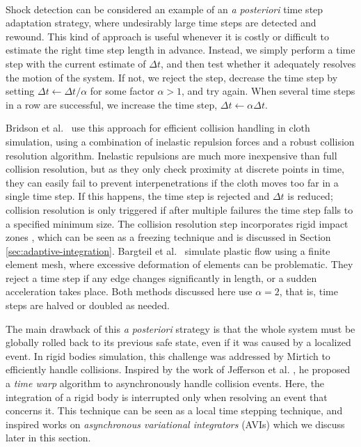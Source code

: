 \paragraph*{}
Shock detection can be considered an example of an \textit{a posteriori} time step adaptation strategy, where undesirably large time steps are detected and rewound.
This kind of approach is useful whenever it is costly or difficult to estimate the right time step length in advance.
Instead, we simply perform a time step with the current estimate of $\Delta t$, and then test whether it adequately resolves the motion of the system.
If not, we reject the step, decrease the time step by setting $\Delta t\gets\Delta t/\alpha$ for some factor $\alpha>1$, and try again.
When several time steps in a row are successful, we increase the time step, $\Delta t\gets\alpha\Delta t$.

Bridson et al.~\cite{Bridson2002} use this approach for efficient collision handling in cloth simulation, using a combination of inelastic repulsion forces and a robust collision resolution algorithm.
Inelastic repulsions are much more inexpensive than full collision resolution, but as they only check proximity at discrete points in time, they can easily fail to prevent interpenetrations if the cloth moves too far in a single time step.
If this happens, the time step is rejected and $\Delta t$ is reduced; collision resolution is only triggered if after multiple failures the time step falls to a specified minimum size.
The collision resolution step incorporates rigid impact zones \cite{Provot1997}, which can be seen as a freezing technique and is discussed in Section \ref{sec:adaptive-integration}.
Bargteil et al.~\cite{Bargteil2007} simulate plastic flow using a finite element mesh, where excessive deformation of elements can be problematic.
They reject a time step if any edge changes significantly in length, or a sudden acceleration takes place.
Both methods discussed here use $\alpha=2$, that is, time steps are halved or doubled as needed.

The main drawback of this \textit{a posteriori} strategy is that the whole system must be globally rolled back to its previous safe state, even if it was caused by a localized event.
In rigid bodies simulation, this challenge was addressed by Mirtich \cite{Mirtich2000} to efficiently handle collisions.
Inspired by the work of Jefferson et al. \cite{Jefferson1985}, he proposed a \emph{time warp} algorithm to asynchronously handle collision events.
Here, the integration of a rigid body is interrupted only when resolving an event that concerns it.
This technique can be seen as a local time stepping technique, and inspired works on \emph{asynchronous variational integrators} (AVIs) which we discuss later in this section.

